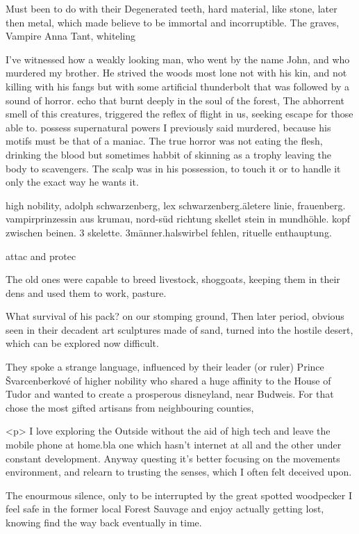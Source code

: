 \documentclass{article}
\begin{document}
Must been to do with their Degenerated teeth, 
hard material, like stone, later then metal, which made believe to be 
immortal and incorruptible.
The graves, Vampire 
Anna Tant, whiteling

I've witnessed how a weakly looking man, who went by the name John, 
and who murdered my brother. 
He strived the woods most lone not with his kin,
and not killing with his fangs but with some artificial thunderbolt
that was followed by a sound of horror. 
echo that burnt deeply in the soul of the forest, 
The abhorrent smell of this creatures, 
triggered the reflex of flight in us,
seeking escape for those able to.
possess supernatural powers 
I previously said murdered, because his motifs
must be that of a maniac.
The true horror was not eating the flesh, drinking the blood but
sometimes habbit of skinning as a trophy
leaving the body to scavengers.
The scalp was in his possession, to touch it or to handle it 
only the exact way he wants it. 

high nobility, 
adolph schwarzenberg, 
lex schwarzenberg.äletere linie, frauenberg.
vampirprinzessin aus krumau, nord-süd richtung skellet
stein in mundhöhle. kopf zwischen beinen. 
3 skelette. 3männer.halswirbel fehlen, rituelle
enthauptung. 


attac and protec

The old ones were capable to breed livestock, 
shoggoats, keeping them in their dens
and used them to work, pasture. 

What survival of his pack?
on our stomping ground, 
Then later period, obvious 
seen in their decadent art 
sculptures made of sand, 
turned into the hostile desert, which can be explored now
difficult. 


They spoke a strange language, influenced by their leader (or ruler) Prince Švarcenberkové
of higher nobility
who shared a huge affinity to the House of Tudor
and wanted to create a prosperous disneyland, near Budweis.
For that chose the most gifted artisans from neighbouring counties, 



<p>
I love exploring the Outside without the aid of high tech and leave the mobile phone at home.bla
one which hasn't internet at all and the other under constant development.
Anyway questing it's better focusing on the movements environment, and relearn to trusting the senses, 
which I often felt deceived upon.


The enourmous silence, only to be interrupted by the great spotted woodpecker 
I feel safe in the former local Forest Sauvage  
and enjoy actually getting lost, knowing find the way back eventually in time.
\end{document}
